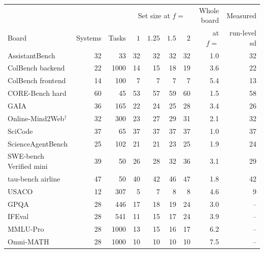 \begin{tabular}{lrrrrrrrr}
\toprule
 & & & \multicolumn{4}{c}{Set size at $f=$} & Whole board & Measured \\
\cmidrule(lr){4-7}
Board & Systems & Tasks & $1$ & $1.25$ & $1.5$ & $2$ & at $f=$ & run-level sd \\
\midrule
AssistantBench & 32 & 33 & 32 & 32 & 32 & 32 & 1.0 & 32 \\
ColBench backend & 22 & 1000 & 14 & 15 & 18 & 19 & 3.6 & 22 \\
ColBench frontend & 14 & 100 & 7 & 7 & 7 & 7 & 5.4 & 13 \\
CORE-Bench hard & 60 & 45 & 53 & 57 & 59 & 60 & 1.5 & 58 \\
GAIA & 36 & 165 & 22 & 24 & 25 & 28 & 3.4 & 26 \\
Online-Mind2Web$^\dagger$ & 32 & 300 & 23 & 27 & 29 & 31 & 2.1 & 32 \\
SciCode & 37 & 65 & 37 & 37 & 37 & 37 & 1.0 & 37 \\
ScienceAgentBench & 25 & 102 & 21 & 21 & 23 & 25 & 1.9 & 24 \\
SWE-bench Verified mini & 39 & 50 & 26 & 28 & 32 & 36 & 3.1 & 29 \\
tau-bench airline & 47 & 50 & 40 & 42 & 46 & 47 & 1.8 & 42 \\
USACO & 12 & 307 & 5 & 7 & 8 & 8 & 4.6 & 9 \\
\midrule
GPQA & 28 & 446 & 17 & 18 & 19 & 24 & 3.0 & -- \\
IFEval & 28 & 541 & 11 & 15 & 17 & 24 & 3.9 & -- \\
MMLU-Pro & 28 & 1000 & 13 & 15 & 16 & 17 & 6.2 & -- \\
Omni-MATH & 28 & 1000 & 10 & 10 & 10 & 10 & 7.5 & -- \\
\bottomrule
\end{tabular}

